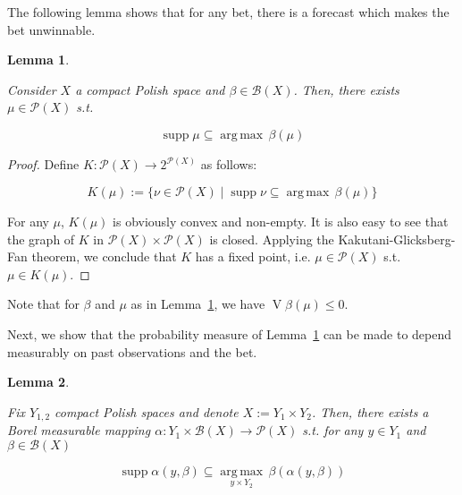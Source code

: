 \documentclass[aop,preprint]{imsart}
\numberwithin{equation}{section}
\theoremstyle{definition}
\theoremstyle{plain}
\newtheorem{lemma}{Lemma}[section]
\newcommand{\Argmax}[1]{\underset{#1}{\operatorname{arg\,max}}\,}
\newcommand{\PM}{\mathcal{P}}
\DeclareMathOperator{\Sp}{supp}
\newcommand{\Gm}{\mathcal{B}}
\DeclareMathOperator{\V}{V}
\begin{document}
The following lemma shows that for any bet, there is a forecast which makes the bet unwinnable.

\begin{lemma}
\label{lmm:unwinnable}

Consider $X$ a compact Polish space and $\beta \in \Gm\left(X\right)$. Then, there exists $\mu \in \PM\left(X\right)$ s.t.

\begin{equation}
\Sp \mu \subseteq \Argmax{} \beta\left(\mu\right)
\end{equation}

\end{lemma}

\begin{proof}

Define ${K: \PM\left(X\right) \rightarrow 2^{\PM\left(X\right)}}$ as follows:

\[K\left(\mu\right):=\{\nu \in \PM\left(X\right) \mid \Sp{\nu} \subseteq \Argmax{}{\beta\left(\mu\right)}\}\]

For any ${\mu}$, ${K}\left(\mu\right)$ is obviously convex and non-empty. It is also easy to see that the graph of $K$ in $\PM\left(X\right) \times \PM\left(X\right)$ is closed. Applying the Kakutani-Glicksberg-Fan theorem, we conclude that $K$ has a fixed point, i.e. $\mu \in \PM\left(X\right)$ s.t. $\mu \in K\left(\mu\right)$.
\end{proof}

Note that for $\beta$ and $\mu$ as in Lemma~\ref{lmm:unwinnable}, we have $\V{\beta}(\mu) \leq 0$.

Next, we show that the probability measure of Lemma~\ref{lmm:unwinnable} can be made to depend measurably on past observations and the bet.

\begin{lemma}
\label{lmm:measurable_unwinnable}

Fix $Y_{1,2}$ compact Polish spaces and denote $X:=Y_1 \times Y_2$. Then, there exists a Borel measurable mapping $\alpha: Y_1 \times \Gm\left(X\right) \rightarrow \PM\left(X\right)$ s.t. for any $y \in Y_1$ and $\beta \in \Gm\left(X\right)$

\begin{equation}
\Sp \alpha\left(y,\beta\right) \subseteq \Argmax{y \times Y_2} \beta\left(\alpha\left(y,\beta\right)\right)
\end{equation}

\end{lemma}
\end{document}
